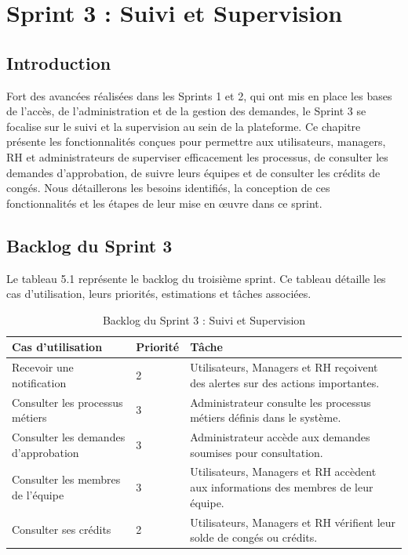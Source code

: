 \chapter{Sprint 3 : Suivi et Supervision}
\section{Introduction}
Fort des avancées réalisées dans les Sprints 1 et 2, qui ont mis en place les bases de l’accès, de l’administration et de la gestion des demandes, le Sprint 3 se focalise sur le suivi et la supervision au sein de la plateforme. Ce chapitre présente les fonctionnalités conçues pour permettre aux utilisateurs, managers, RH et administrateurs de superviser efficacement les processus, de consulter les demandes d’approbation, de suivre leurs équipes et de consulter les crédits de congés. Nous détaillerons les besoins identifiés, la conception de ces fonctionnalités et les étapes de leur mise en œuvre dans ce sprint.
\section{Backlog du Sprint 3}
Le tableau 5.1 représente le backlog du troisième sprint. Ce tableau détaille les cas d’utilisation, leurs priorités, estimations et tâches associées.
\begin{table}[!ht]
    \begin{adjustwidth}{-3.5cm}{-3.5cm}
        \vspace{-0.2cm}
    \centering
    \caption{Backlog du Sprint 3 : Suivi et Supervision}
    \label{tab:backlog_sprint3_suivi}
    \begin{tabular}{ | m{5cm} | m{1cm} | m{11.5cm} | }
    \hline
    \cellcolor[rgb]{0.832,0.832,0.832}Cas d'utilisation & \cellcolor[rgb]{0.832,0.832,0.832}Priorité & \cellcolor[rgb]{0.832,0.832,0.832}Tâche \\
    \hline
    Recevoir une notification & 2 & Utilisateurs, Managers et RH reçoivent des alertes sur des actions importantes. \\
    \hline
    Consulter les processus métiers & 3 & Administrateur consulte les processus métiers définis dans le système. \\
    \hline
    Consulter les demandes d’approbation & 3 & Administrateur accède aux demandes soumises pour consultation. \\
    \hline
    Consulter les membres de l’équipe & 3 & Utilisateurs, Managers et RH accèdent aux informations des membres de leur équipe. \\
    \hline
    Consulter ses crédits & 2 & Utilisateurs, Managers et RH vérifient leur solde de congés ou crédits. \\
    \hline
    \end{tabular}
    \end{adjustwidth}
\end{table}
\newpage
